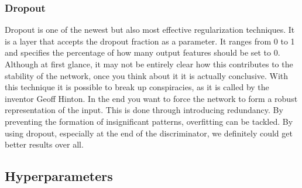     
    
    \subsubsection{Dropout}
    Dropout is one of the newest but also most effective regularization techniques. It is a layer that accepts the dropout fraction as a parameter. It ranges from 0 to 1 and specifies the percentage of how many output features should be set to 0. \\
    Although at first glance, it may not be entirely clear how this contributes to the stability of the network, once you think about it it is actually conclusive. With this technique it is possible to break up conspiracies, as it is called by  the inventor Geoff Hinton\cite{JMLR:v15:srivastava14a}. In the end you want to force the network to form a robust representation of the input. This is done through introducing redundancy. By preventing the formation of insignificant patterns, overfitting can be tackled. By using dropout, especially at the end of the discriminator, we definitely could get better results over all.

    \subsection{Hyperparameters}


